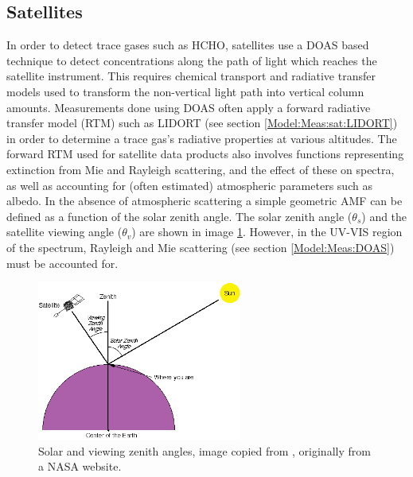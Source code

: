   \subsection{Satellites}
    \label{Model:Meas:sat}
    
    In order to detect trace gases such as HCHO, satellites use a DOAS based technique to detect concentrations along the path of light which reaches the satellite instrument.
    This requires chemical transport and radiative transfer models used to transform the non-vertical light path into vertical column amounts.
    Measurements done using DOAS often apply a forward radiative transfer model (RTM) such as LIDORT (see section \ref{Model:Meas:sat:LIDORT}) in order to determine a trace gas's radiative properties at various altitudes.
    The forward RTM used for satellite data products also involves functions representing extinction from Mie and Rayleigh scattering, and the effect of these on spectra, as well as accounting for (often estimated) atmospheric parameters such as albedo.
    In the absence of atmospheric scattering a simple geometric AMF can be defined as a function of the solar zenith angle. 
    The solar zenith angle ($\theta_s$) and the satellite viewing angle ($\theta_v$) are shown in image \ref{ch_HCHO:fig:zenithangle}.
    However, in the UV-VIS region of the spectrum, Rayleigh and Mie scattering (see section \ref{Model:Meas:DOAS}) must be accounted for.
    
    
    \begin{figure}\begin{center}
      \includegraphics[width=0.6\textwidth]{Figures/ZenithAngles.png}
      \caption{Solar and viewing zenith angles, image copied from \textcite{SZA_Image}, originally from a NASA website.}
      \label{ch_HCHO:fig:zenithangle}
    \end{center}\end{figure}
    
